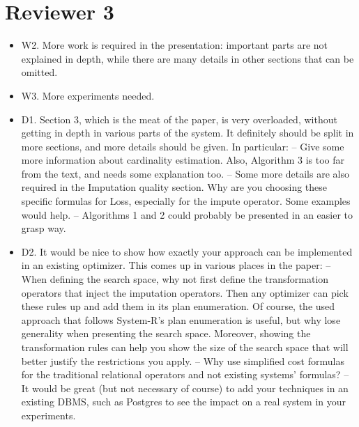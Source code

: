 \documentclass{vldb}
\newcommand{\resp}[1]{{\color{blue}{#1}}}
\begin{document}
  \section{Reviewer 3}
  \begin{itemize}
  \item W2. More work is required in the presentation: important parts are not explained in depth, while there are many details in other sections that can be omitted.

  \item W3. More experiments needed.
  
  \resp{
  We've extended the evaluation section to include more impute operators and an evaluation of planning times.
  }

  \item D1. Section 3, which is the meat of the paper, is very overloaded, without getting in depth in various parts of the system. It definitely should be split in more sections, and more details should be given. In particular:
    -- Give some more information about cardinality estimation. Also, Algorithm 3 is too far from the text, and needs some explanation too.
    -- Some more details are also required in the Imputation quality section. Why are you choosing these specific formulas for Loss, especially for the impute operator. Some examples would help.
    -- Algorithms 1 and 2 could probably be presented in an easier to grasp way.
    
    \resp{
    We've broken up this section and consolidated algorithm notation. The cardinality estimation section provides more detail about the algorithm. We also
    added intuition for how the heuristic Penalty (a renaming of Loss, for clarity) and Time should be designed. We walk through these definitions for three different
    impute operators.
    }

  \item D2. It would be nice to show how exactly your approach can be implemented in an existing optimizer. This comes up in various places in the paper:
    -- When defining the search space, why not first define the transformation operators that inject the imputation operators. Then any optimizer can pick these rules up and add them in its plan enumeration. Of course, the used approach that follows System-R's plan enumeration is useful, but why lose generality when presenting the search space. Moreover, showing the transformation rules can help you show the size of the search space that will better justify the restrictions you apply.
    -- Why use simplified cost formulas for the traditional relational operators and not existing systems' formulas?
    -- It would be great (but not necessary of course) to add your techniques in an existing DBMS, such as Postgres to see the impact on a real system in your experiments.


\end{itemize}
\end{document}
